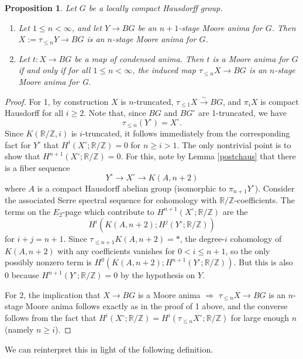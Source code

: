 \documentclass[12pt]{article}
\newtheorem{proposition}[theorem]{Proposition}
\theoremstyle{definition}
\newcommand{\mbb}{\mathbb}
\begin{document}
\begin{proposition}\label{moorevstmoore}
Let $G$ be a locally compact Hausdorff group.

\begin{enumerate}
\item Let $1 \leq n <\infty$, and let $Y\to BG$ be an $n+1$-stage Moore anima for $G$.  Then $X:=\tau_{\leq n}Y \to BG$ is an $n$-stage Moore anima for $G$.
\item Let $t:X \to BG$ be a map of condensed anima.  Then $t$ is a Moore anima for $G$ if and only if for all $1\leq n<\infty$, the induced map $\tau_{\leq n}X \to BG$ is an $n$-stage Moore anima for G.
\end{enumerate}
\end{proposition}
\begin{proof}
For 1, by construction $X$ is $n$-truncated, $\tau_{\leq 1}X \overset{\sim}{\rightarrow} BG$, and $\pi_iX$ is compact Hausdorff for all $i\geq 2$.  Note that, since $BG$ and $BG^\circ$ are 1-truncated, we have
$$\tau_{\leq n}(Y^\circ) = X^\circ.$$
Since $K(\mbb{R}/\mbb{Z},i)$ is $i$-truncated, it follows immediately from the corresponding fact for $Y^\circ$ that $H^i(X^\circ;\mbb{R}/\mbb{Z})=0$ for $n\geq i>1$.  The only nontrivial point is to show that $H^{n+1}(X^\circ;\mbb{R}/\mbb{Z})=0$.  For this, note by Lemma \ref{postchaus} that there is a fiber sequence
$$Y^\circ \to X^\circ \to K(A,n+2)$$
where $A$ is a compact Hausdorff abelian group (isomorphic to $\pi_{n+1}Y^\circ$).  Consider the associated Serre spectral sequence for cohomology with $\mbb{R}/\mbb{Z}$-coefficients.  The terms on the $E_2$-page which contribute to $H^{n+1}(X^\circ;\mbb{R}/\mbb{Z})$ are the
$$H^i(K(A,n+2);H^j(Y^\circ;\mbb{R}/\mbb{Z}))$$
for $i+j=n+1$.  Since $\tau_{\leq n+1}K(A,n+2)=\ast$, the degree-$i$ cohomology of $K(A,n+2)$ with any coefficients vanishes for $0<i\leq n+1$, so the only possibly nonzero term is $H^0(K(A,n+2);H^{n+1}(Y^\circ;\mbb{R}/\mbb{Z}))$. But this is also $0$ because $H^{n+1}(Y^\circ;\mbb{R}/\mbb{Z})=0$ by the hypothesis on $Y$.

For 2, the implication that $X\to BG$ is a Moore anima $\Rightarrow$  $\tau_{\leq n}X \to BG$ is an $n$-stage Moore anima follows exactly as in the proof of 1 above, and the converse follows from the fact that $H^i(X^\circ;\mbb{R}/\mbb{Z}) = H^i(\tau_{\leq n}X^\circ;\mbb{R}/\mbb{Z})$ for large enough $n$ (namely $n\geq i$).
\end{proof}

We can reinterpret this in light of the following definition.
\end{document}
